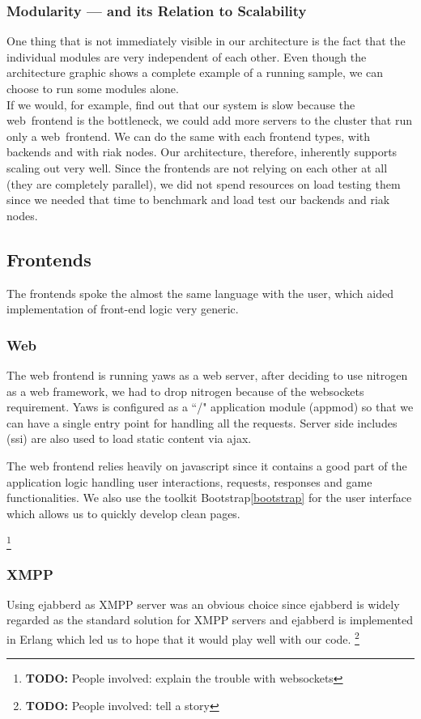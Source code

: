 \documentclass[11pt,a4paper]{report}
\newcommand{\todo}[1]{\footnote{{\color{red} {\bf TODO:} #1}}}
\begin{document}
\subsubsection{Modularity --- and its Relation to Scalability}
One thing that is not immediately visible in our architecture is the fact that
the individual modules are very independent of each other. Even though the
architecture graphic shows a complete example of a running sample, we can choose
to run some modules alone. \\
If we would, for example, find out that our system is slow because the
web~frontend is the bottleneck, we could add more servers to the cluster that
run only a web~frontend. We can do the same with each frontend types,
with backends and with riak nodes. Our architecture, therefore, inherently
supports scaling out very well. Since the frontends are not relying on each
other at all (they are completely parallel), we did not spend resources on
load testing them since we needed that time to benchmark and load test our
backends and riak nodes.
\subsection{Frontends}
\label{sec:frontends}

The frontends spoke the almost the same language with the user, which aided
implementation of front-end logic very generic.

\subsubsection{Web}
The web frontend is running yaws as a web server, after deciding to use nitrogen
as a web framework, we had to drop nitrogen because of the websockets
requirement. Yaws is configured as a ``/" application module (appmod) so that we can have a single entry point for handling all the requests. Server side includes (ssi) are also used to load static content via ajax.

The web frontend relies heavily on javascript since it contains a good part of the application logic handling user interactions, requests, responses and game functionalities. We also use the toolkit Bootstrap\ref{bootstrap} for the user interface which allows us to quickly develop clean pages.

\todo{People involved: explain the trouble with websockets}

\subsubsection{XMPP}
Using ejabberd as XMPP server was an obvious choice since ejabberd is widely
regarded as the standard solution for XMPP servers and ejabberd is implemented
in Erlang which led us to hope that it would play well with our code. \todo{People involved: tell a story}
\end{document}
